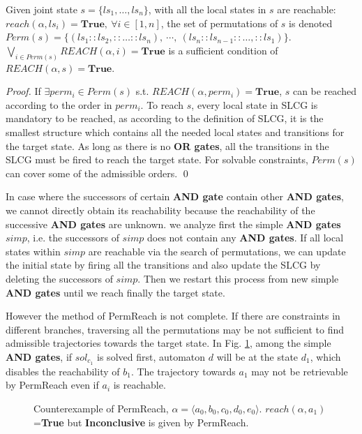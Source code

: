 \documentclass[runningheads]{llncs}
\begin{document}
\begin{proposition}\label{theoperm}
Given joint state $s=\{ls_1,\ldots,ls_n\}$, with all the local states in $s$ are reachable: $reach(\alpha,ls_i)=\mathbf{True},\ \forall i\in[1,n]$, the set of permutations of $s$ is denoted $Perm(s)=\{(ls_1::ls_2,::\ldots ::ls_n),\ \cdots,\ (ls_n::ls_{n-1}::\ldots,::ls_1)\}$. $\bigvee_{i\in Perm(s)} REACH(\alpha,i)=\mathbf{True}$ is a sufficient condition of $REACH(\alpha,s)=\mathbf{True}$.
\end{proposition}
\begin{proof}
If $\exists perm_i\in Perm(s)$ s.t. $REACH(\alpha,perm_i)=\mathbf{True}$, $s$ can be reached according to the order in $perm_i$.
To reach $s$, every local state in SLCG is mandatory to be reached, as according to the definition of SLCG, it is the smallest structure which contains all the needed local states and transitions for the target state. As long as there is no \textbf{OR gates}, all the transitions in the SLCG must be fired to reach the target state.
For solvable constraints, $Perm(s)$ can cover some of the admissible orders.
\qed\end{proof}

In case where the successors of certain \textbf{AND gate} contain other \textbf{AND gates}, we cannot directly obtain its reachability because the reachability of the successive \textbf{AND gates} are unknown.
we analyze first the simple \textbf{AND gates} $simp$, i.e. the successors of $simp$ does not contain any \textbf{AND gates}.
If all local states within $simp$ are reachable via the search of permutations, we can update the initial state by firing all the transitions and also update the SLCG by deleting the successors of $simp$. 
Then we restart this process from new simple \textbf{AND gates} until we reach finally the target state.

However the method of PermReach is not complete. 
If there are constraints in different branches, traversing all the permutations may be not sufficient to find admissible trajectories towards the target state.
In Fig. \ref{FigConflictInForks}, among the simple \textbf{AND gates}, if $sol_{c_1}$ is solved first, automaton $d$ will be at the state $d_1$, which disables the reachability of $b_1$.
The trajectory towards $a_1$ may not be retrievable by PermReach even if $a_i$ is reachable.
\begin{figure}[ht]
\centering

\caption{Counterexample of PermReach, $\alpha=\langle a_0,b_0,c_0,d_0,e_0\rangle$. 
$reach(\alpha,a_1)$=\textbf{True} but \textbf{Inconclusive} is given by PermReach.
}\label{FigConflictInForks}
\end{figure}
\end{document}
